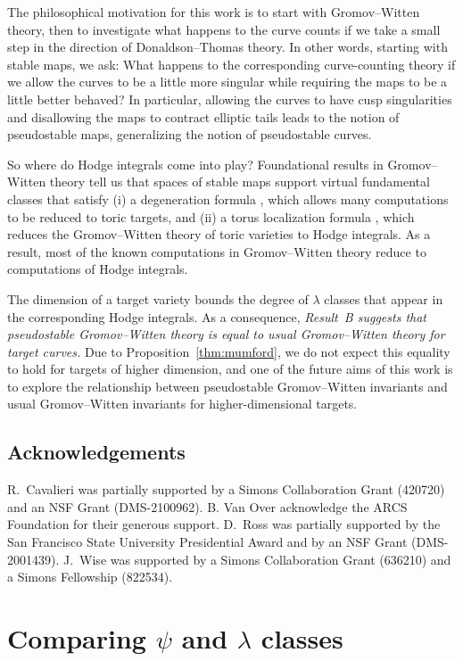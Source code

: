 \documentclass[12pt]{amsart}
\theoremstyle{definition}
\numberwithin{equation}{section}
\begin{document}
The philosophical motivation for this work is to start with Gromov--Witten theory, then to investigate what happens to the curve counts if we take a small step in the direction of Donaldson--Thomas theory. In other words, starting with stable maps, we ask: What happens to the corresponding curve-counting theory if we allow the curves to be a little more singular while requiring the maps to be a little better behaved? In particular, allowing the curves to have cusp singularities and disallowing the maps to contract elliptic tails leads to the notion of pseudostable maps, generalizing the notion of pseudostable curves.

So where do Hodge integrals come into play? Foundational results in Gromov--Witten theory tell us that spaces of stable maps support virtual fundamental classes \cite{BehrendFantechi} that satisfy (i) a degeneration formula \cite{Li}, which allows many computations to be reduced to toric targets, and (ii) a torus localization formula \cite{GraberPandharipande}, which reduces the Gromov--Witten theory of toric varieties to Hodge integrals. As a result, most of the known computations in Gromov--Witten theory reduce to computations of Hodge integrals. 

The dimension of a target variety bounds the degree of $\lambda$ classes that appear in the corresponding Hodge integrals. As a consequence, \emph{Result~B suggests that pseudostable Gromov--Witten theory is equal to usual Gromov--Witten theory for target curves.} Due to Proposition~\ref{thm:mumford}, we do not expect this equality to hold for targets of higher dimension, and one of the future aims of this work is to explore the relationship between pseudostable Gromov--Witten invariants and usual Gromov--Witten invariants for higher-dimensional targets.
 

\subsection{Acknowledgements}
	R.~Cavalieri was partially supported by a Simons Collaboration Grant (420720) and an NSF Grant (DMS-2100962). B. Van Over acknowledge the ARCS Foundation for their generous support. D.~Ross was partially supported by the San Francisco State University Presidential Award and by an NSF Grant (DMS-2001439). J.~Wise was supported by a Simons Collaboration Grant (636210) and a Simons Fellowship (822534).

\section{Comparing $\psi$ and $\lambda$ classes}\label{sec:comparingclasses}
\end{document}
